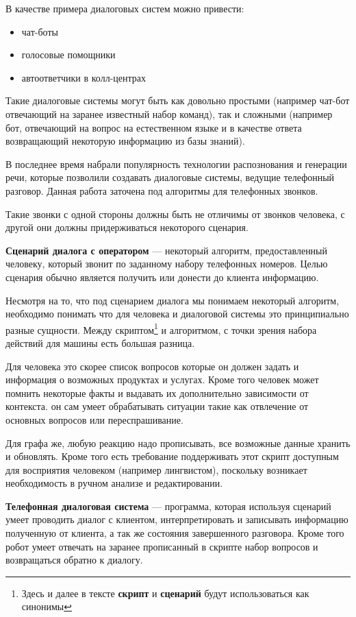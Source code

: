 \documentclass[specification,annotation]{itmo-student-thesis}
\begin{document}
	В качестве примера диалоговых систем можно привести: 
	\begin{itemize}
		\item чат-боты
		\item голосовые помощники
		\item автоответчики в колл-центрах
	\end{itemize}

	Такие диалоговые системы могут быть как довольно простыми (например чат-бот отвечающий на заранее известный набор команд), так и сложными (например бот, отвечающий на вопрос на естественном языке и в качестве ответа возвращающий некоторую информацию из базы знаний).
	
	В последнее время набрали популярность технологии распознования и генерации речи, которые позволили создавать диалоговые системы, ведущие телефонный разговор. Данная работа заточена под алгоритмы для телефонных звонков.
	
	Такие звонки с одной стороны должны быть не отличимы от звонков человека, с другой они должны придерживаться некоторого сценария.
	
	\textbf{Сценарий диалога с оператором} — некоторый алгоритм, предоставленный человеку, который звонит по заданному набору телефонных номеров. Целью сценария обычно является получить или донести до клиента информацию. 
	
	Несмотря на то, что под сценарием диалога мы понимаем некоторый алгоритм, необходимо понимать что для человека и диалоговой системы это принципиально разные сущности. Между скриптом\footnote{Здесь и далее в тексте \textbf{скрипт} и \textbf{сценарий} будут использоваться как синонимы} и алгоритмом, с точки зрения набора действий для машины есть большая разница. 
	
	Для человека это скорее список вопросов которые он должен задать и информация о возможных продуктах и услугах. Кроме того человек может помнить некоторые факты и выдавать их дополнительно зависимости от контекста. он сам умеет обрабатывать ситуации такие как отвлечение от основных вопросов или переспрашивание.
	
	Для графа же, любую реакцию надо прописывать, все возможные данные хранить и обновлять. Кроме того есть требование поддерживать этот скрипт доступным для восприятия человеком (например лингвистом), поскольку возникает необходимость в ручном анализе и редактировании.
	
	\textbf{Телефонная диалоговая система} — программа, которая используя сценарий умеет проводить диалог с клиентом, интерпретировать и записывать  информацию полученную от клиента, а так же состояния завершенного разговора. Кроме того робот умеет отвечать на заранее прописанный в скрипте набор вопросов и возвращаться обратно к диалогу.
	
\end{document}
